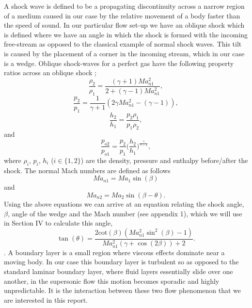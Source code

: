 \documentclass[a4paper,10pt,twoside]{article}
\begin{document}
\begin{multicols}{2}
A shock wave is defined to be a propagating discontinuity across a narrow region of a medium caused in our case by the relative movement of a body faster than the speed of sound. In our particular flow set-up we have an oblique shock \cite{8} which is defined where we have an angle in which the shock is formed with the incoming free-stream as opposed to the classical example of normal shock waves. This tilt is caused by the placement of a corner in the incoming stream, which in our case is a wedge. Oblique shock-waves for a perfect gas have the following property ratios across an oblique shock \cite{8};
\begin{equation}
    \frac{\rho_2}{\rho_1} = \frac{(\gamma + 1)Ma_{n1}^2}{2+(\gamma-1)Ma_{n1}^2},
\end{equation}
\begin{equation}
    \frac{p_2}{p_1} = \frac{1}{\gamma+1}(2\gamma Ma_{n1}^2 - (\gamma-1)),
\end{equation}
\begin{equation}
    \frac{h_2}{h_1} = \frac{p_2 \rho_1}{p_1 \rho_2},
\end{equation}
and
\begin{equation}
    \frac{p_{o2}}{p_{o1}} = \frac{p_2}{p_1}\bigg(\frac{h_2}{h_1}\bigg)^{\frac{\gamma}{\gamma-1}},
\end{equation}
where $\rho_i$, $p_i$, $h_i$ ($i \in \{1,2\}$) are the density, pressure and enthalpy before/after the shock. The normal Mach numbers are defined as follows
\begin{equation}
    Ma_{n1} = Ma_1 \sin(\beta)
\end{equation}
and
\begin{equation}
    Ma_{n2} = Ma_2 \sin(\beta-\theta).
\end{equation}
Using the above equations we can arrive at an equation relating the shock angle, $\beta$, angle of the wedge and the Mach number (see appendix 1), which we will use in Section IV to calculate this angle,
\begin{equation}
    \tan(\theta) = \frac{2 \text{cot}(\beta)(Ma_{n1}^2 \sin^2(\beta) - 1) }{Ma_{n1}^2(\gamma+\cos(2\beta))+2}.
\end{equation}. 
A boundary layer is a small region where viscous effects dominate near a moving body. In our case this boundary layer is turbulent so as opposed to the standard laminar boundary layer, where fluid layers essentially slide over one another, in the supersonic flow this motion becomes sporadic and highly unpredictable. It is the interaction between these two flow phenomenon that we are interested in this report.




\end{multicols}
\end{document}
